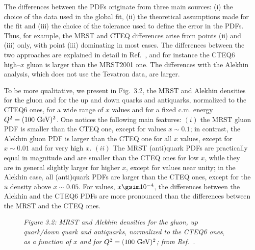 The differences between the PDFs originate from three main sources: (i) the
choice of the data used in the global fit, (ii) the theoretical assumptions
made for the fit and (iii) the choice of the tolerance used to define the error
in the PDFs. Thus, for example, the MRST and CTEQ differences arise from points
(ii) and (iii) only, with point (iii) dominating in most cases. The differences
between the two approaches \cite{CTEQ6,MRST2001E} are explained in detail in 
Ref.~\cite{MRST2001E}, and for instance the CTEQ6 high--$x$ gluon is larger 
than the MRST2001 one. The differences with the Alekhin analysis, which does 
not use the Tevatron data, are larger.\s 

To be more qualitative, we present in Fig.~3.2, the MRST and Alekhin densities
for the gluon and for the up and down quarks and antiquarks, normalized to the
CTEQ6 ones, for a wide range of $x$ values and for a fixed c.m.  energy
$Q^2=(100\ {\rm GeV})^2$. One notices the following main features: $(i)$ the
MRST gluon PDF is smaller than the CTEQ one, except for values $x\sim 0.1$; in
contrast, the Alekhin gluon PDF is larger than the  CTEQ one for all $x$
values, except for $x \sim 0.01$ and for very high $x$. $(ii)$ The MRST
(anti)quark PDFs are practically equal in magnitude and are smaller than the
CTEQ ones for low $x$, while they are in general slightly larger for higher
$x$, except for values near unity; in the Alekhin case, all (anti)quark PDFs
are larger than the CTEQ ones, except for the $\bar{u}$ density above $x \sim
0.05$. For values, $x \gsim 10^{-4}$, the differences between the Alekhin and
the CTEQ6 PDFs are more pronounced than the differences between the MRST and
the CTEQ ones.\s

\begin{figure}[h]
\begin{center}
\vspace*{-2.5cm}
\hspace*{-1cm}
\vspace*{-15.9cm}
\end{center}
{\it Figure 3.2: MRST and Alekhin densities for the gluon, up quark/down
quark and antiquarks, normalized to the CTEQ6 ones, as a function of $x$ and
for $Q^2=(100\ {\rm GeV})^2$; from Ref.~\cite{Samir}.}
\vspace*{-6mm}
\end{figure}

